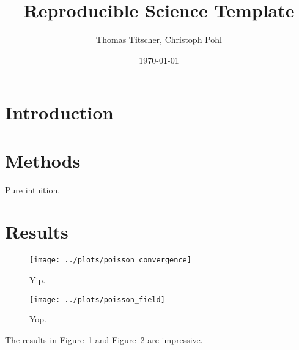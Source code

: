 \documentclass[12pt,abstract]{scrartcl}
\title{Reproducible Science Template}
\author{Thomas Titscher, Christoph Pohl}
\date{\today}
\begin{document}
\maketitle

\begin{abstract}
  \lipsum[10]
\end{abstract}

\section{Introduction}

\lipsum[10]

\section{Methods}

Pure intuition.

\section{Results}

\begin{figure}[bt]
  \centering
  \texttt{[image: ../plots/poisson\_convergence]}
  \caption{Yip.}%
  \label{fig:poisson_convergence}
\end{figure}

\begin{figure}[bt]
  \centering
  \texttt{[image: ../plots/poisson\_field]}
  \caption{Yop.}%
  \label{fig:poisson_field}
\end{figure}

The results in Figure~\ref{fig:poisson_convergence} and Figure~\ref{fig:poisson_field} are impressive.
\end{document}
